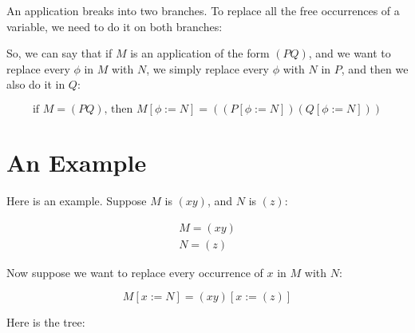 \documentclass{book}
\numberwithin{equation}{chapter}
\begin{document}
\noindent
An application breaks into two branches. To replace all the free occurrences of a variable, we need to do it on both branches:

\begin{center}
\end{center}

\noindent
So, we can say that if $M$ is an application of the form $(P Q)$, and we want to replace every $\phi$ in $M$ with $N$, we simply replace every $\phi$ with $N$ in $P$, and then we also do it in $Q$:

\begin{equation}
\text{if $M = (P Q)$, then $M[\phi := N] = ((P[\phi := N])(Q[\phi := N]))$}
\end{equation}


\section{An Example}

Here is an example. Suppose $M$ is $(x y)$, and $N$ is $(z)$:

\begin{align}
M = (x y) \\
N = (z)
\end{align}

\noindent
Now suppose we want to replace every occurrence of $x$ in $M$ with $N$:

\begin{equation}
M[x := N] = (x y)[x := (z)]
\end{equation}

\noindent
Here is the tree:

\begin{center}
\end{center}
\end{document}
